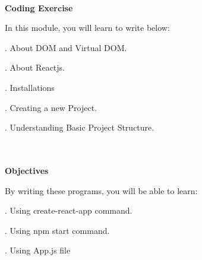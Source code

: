 \documentclass{article}
\begin{document}

\noindent 

\noindent\\
 \textbf{Coding Exercise}

\noindent
 In this module, you will learn to write below:

. About DOM and Virtual DOM.

. About Reactjs.

. Installations

. Creating a new Project.

. Understanding Basic Project Structure.

\noindent 

\noindent\\ 
\\
 \textbf{Objectives}

\noindent
 By writing these programs, you will be able to learn:

. Using create-react-app command.

. Using npm start command.

. Using App.js file
\end{document}

